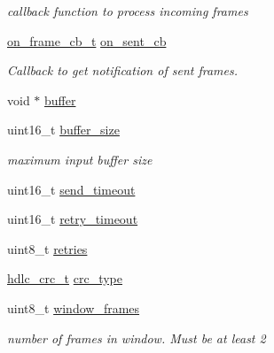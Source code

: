 \begin{DoxyCompactItemize}
\begin{DoxyCompactList}\small\item\em callback function to process incoming frames \end{DoxyCompactList}\item 
\mbox{\label{structSTinyFdInit___a046e2f90d72f4b412cff4ff4f3871736}} 
\hyperlink{tiny__types_8h_ad6bf709565b8aecb9e6ecf196f219d54}{on\+\_\+frame\+\_\+cb\+\_\+t} \hyperlink{structSTinyFdInit___a046e2f90d72f4b412cff4ff4f3871736}{on\+\_\+sent\+\_\+cb}
\begin{DoxyCompactList}\small\item\em Callback to get notification of sent frames. \end{DoxyCompactList}\item 
void $\ast$ \hyperlink{structSTinyFdInit___a7ffe2a907dc18e66e84507b1620c7bfa}{buffer}
\item 
\mbox{\label{structSTinyFdInit___a359626e717ca121225a9adce7e6782ba}} 
uint16\+\_\+t \hyperlink{structSTinyFdInit___a359626e717ca121225a9adce7e6782ba}{buffer\+\_\+size}
\begin{DoxyCompactList}\small\item\em maximum input buffer size \end{DoxyCompactList}\item 
uint16\+\_\+t \hyperlink{structSTinyFdInit___a63abe062807f7467de14c366e6ffcd10}{send\+\_\+timeout}
\item 
uint16\+\_\+t \hyperlink{structSTinyFdInit___a75f9853077c7d614cbdaf49d644ea82a}{retry\+\_\+timeout}
\item 
uint8\+\_\+t \hyperlink{structSTinyFdInit___acaf92c5f021e949607bb7ce161d029e9}{retries}
\item 
\hyperlink{group__HDLC__API_gabb73b32d08d8e79eefe9385634a74bf7}{hdlc\+\_\+crc\+\_\+t} \hyperlink{structSTinyFdInit___a7a0bb8f1faf2c8adac2ac8ed5dcb5afd}{crc\+\_\+type}
\item 
\mbox{\label{structSTinyFdInit___a67643289960e239a8c22e2dbebfebce6}} 
uint8\+\_\+t \hyperlink{structSTinyFdInit___a67643289960e239a8c22e2dbebfebce6}{window\+\_\+frames}
\begin{DoxyCompactList}\small\item\em number of frames in window. Must be at least 2 \end{DoxyCompactList}\end{DoxyCompactItemize}


